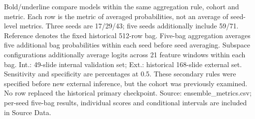 \footnotesize Bold/underline compare models within the same aggregation rule, cohort and metric. Each row is the metric of averaged probabilities, not an average of seed-level metrics. Three seeds are 17/29/43; five seeds additionally include 59/71. Reference denotes the fixed historical 512-row bag. Five-bag aggregation averages five additional bag probabilities within each seed before seed averaging. Subspace configurations additionally average logits across 21 feature windows within each bag. Int.: 49-slide internal validation set; Ext.: historical 168-slide external set. Sensitivity and specificity are percentages at 0.5. These secondary rules were specified before new external inference, but the cohort was previously examined. No row replaced the historical primary checkpoint. Source: ensemble\_metrics.csv; per-seed five-bag results, individual scores and conditional intervals are included in Source Data.
\endgroup
